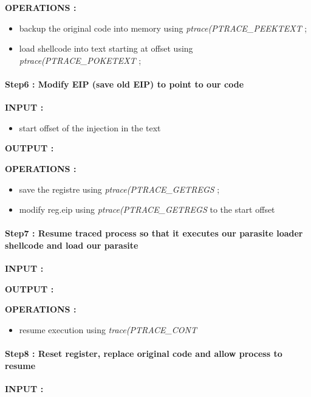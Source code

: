 \documentclass[letterpaper,10pt,english]{sphinxmanual}
\begin{document}
\textbf{OPERATIONS :}
\begin{itemize}
\item {} 
backup the original code into memory using \emph{ptrace(PTRACE\_PEEKTEXT} ;

\item {} 
load shellcode into text starting at offset using \emph{ptrace(PTRACE\_POKETEXT} ;

\end{itemize}


\paragraph{Step6 : Modify EIP (save old EIP) to point to our code}
\label{Annexes/index:step6-modify-eip-save-old-eip-to-point-to-our-code}
\textbf{INPUT :}
\begin{itemize}
\item {} 
start offset of the injection in the text

\end{itemize}

\textbf{OUTPUT :}

\textbf{OPERATIONS :}
\begin{itemize}
\item {} 
save the registre using \emph{ptrace(PTRACE\_GETREGS} ;

\item {} 
modify reg.eip using \emph{ptrace(PTRACE\_GETREGS} to the start offset

\end{itemize}


\paragraph{Step7 : Resume traced process so that it executes our parasite loader shellcode and load our parasite}
\label{Annexes/index:step7-resume-traced-process-so-that-it-executes-our-parasite-loader-shellcode-and-load-our-parasite}
\textbf{INPUT :}

\textbf{OUTPUT :}

\textbf{OPERATIONS :}
\begin{itemize}
\item {} 
resume execution using \emph{trace(PTRACE\_CONT}

\end{itemize}


\paragraph{Step8 : Reset register, replace original code and allow process to resume}
\label{Annexes/index:step8-reset-register-replace-original-code-and-allow-process-to-resume}
\textbf{INPUT :}
\end{document}
